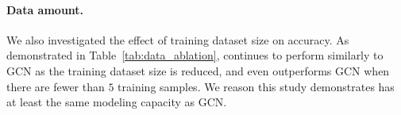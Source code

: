 \paragraph{Data amount.}
We also investigated the effect of training dataset size on accuracy. 
As demonstrated in Table~\ref{tab:data_ablation}, \method{} continues to perform similarly to GCN as the training dataset size is reduced, and even outperforms GCN when there are fewer than $5$ training samples. We reason this study demonstrates \method{} has at least the same modeling capacity as GCN.
%
